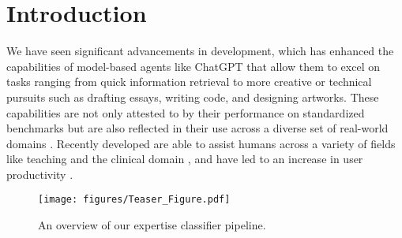 \section{Introduction}


We have seen significant advancements in  development, which has enhanced the capabilities of model-based agents like ChatGPT that allow them to excel on tasks ranging from quick information retrieval to more creative or technical pursuits such as drafting essays, writing code, and designing artworks. These capabilities are not only attested to by their performance on standardized benchmarks but are also reflected in their use across a diverse set of real-world domains \cite{suri2024usegenerativesearchengines}. Recently developed  are able to assist humans across a variety of fields like teaching \cite{wang2024tutorcopilothumanaiapproach, ALSAFARI2024100101} and the clinical domain \cite{han2024ascleai}, and have led to an increase in user productivity \cite{peng2023productivitygithub, cambon2023early}.

\begin{figure}[t!]
    \centering    
    \texttt{[image: figures/Teaser\_Figure.pdf]}
    \caption{An overview of our expertise classifier pipeline.}
    \label{fig:example}
\end{figure}

